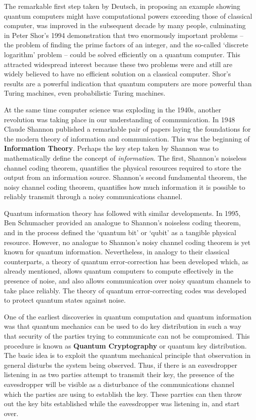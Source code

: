 \documentclass[20pt]{report}
\begin{document}
\par
The remarkable first step taken by Deutsch, in proposing an example showing quantum computers might have computational powers exceeding those of classical computer, was improved in the subsequent decade by many people, culminating in Peter Shor’s 1994 demonstration that two enormously important problems – the problem of finding the prime factors of an integer, and the so-called ‘discrete logarithm’ problem – could be solved efficiently on a quantum computer. This attracted widespread interest because these two problems were and still are widely believed to have no efficient solution on a classical computer. Shor’s results are a powerful indication that quantum computers are more powerful than Turing machines, even probabilistic Turing machines.
\par
At the same time computer science was exploding in the 1940s, another revolution was taking place in our understanding of communication. In 1948 Claude Shannon published a remarkable pair of papers laying the foundations for the modern theory of information and communication. This was the beginning of \textbf{Information Theory}. Perhaps the key step taken by Shannon was to mathematically define the concept of \textit{information}. The first, Shannon’s noiseless channel coding theorem, quantifies
the physical resources required to store the output from an information source. Shannon’s second fundamental theorem, the noisy channel coding theorem, quantifies how much information it is possible to reliably transmit through a noisy communications channel.
\par
Quantum information theory has followed with similar developments. In 1995, Ben Schumacher provided an analogue to Shannon’s noiseless coding theorem, and in the process defined the ‘quantum bit’ or ‘qubit’ as a tangible physical resource. However, no analogue to Shannon’s noisy channel coding theorem is yet known for quantum information. Nevertheless, in analogy to their classical counterparts, a theory of quantum error-correction has been developed which, as already mentioned, allows quantum computers to compute effectively in the presence of noise, and also allows communication over noisy quantum channels to take place reliably. The theory of quantum error-correcting codes was developed to protect quantum states
against noise.
\par
One of the earliest discoveries in quantum computation and quantum information was that quantum mechanics can be used to do key distribution in such a way that security of the parties trying to communicate can not be compromised. This procedure is known as \textbf{Quantum Cryptography} or quantum key distribution. The basic idea is to exploit the quantum mechanical principle that observation in general disturbs the system being observed. Thus, if there is an eavesdropper listening in as two parties attempt to transmit their key, the presence of the eavesdropper will be visible as a disturbance of the communications channel which the parties are using to establish the key. These parrties can then throw out the key bits established while the eavesdropper was listening in, and start over.
\end{document}
